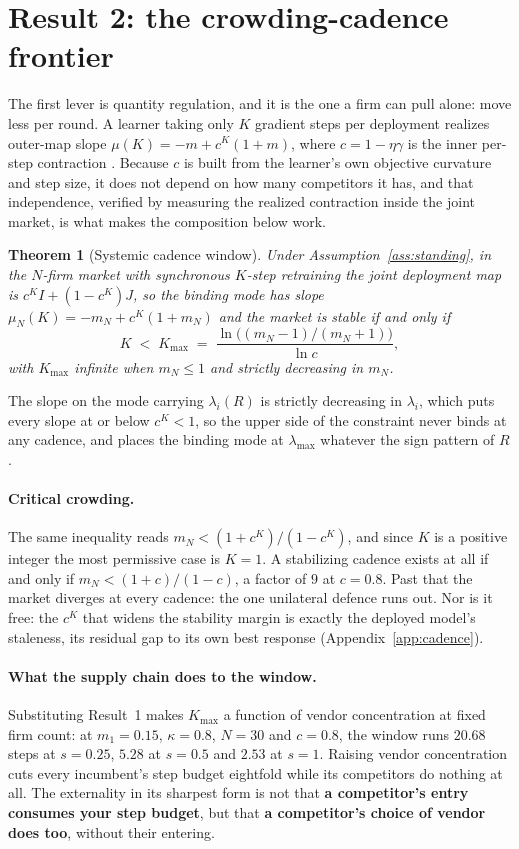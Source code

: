 \documentclass{article}
\theoremstyle{plain}
\newtheorem{theorem}{Theorem}
\theoremstyle{definition}
\newcommand{\mN}{m_N}
\newcommand{\lmax}{\lambda_{\max}}
\begin{document}
\section{Result 2: the crowding-cadence frontier}
\label{sec:cadence}

The first lever is quantity regulation, and it is the one a firm can pull alone: move less per round. A learner taking only $K$ gradient steps per deployment realizes outer-map slope $\mu(K) = -m + c^K(1+m)$, where $c = 1-\eta\gamma$ is the inner per-step contraction \citep{mendlerdunner2020}. Because $c$ is built from the learner's own objective curvature and step size, it does not depend on how many competitors it has, and that independence, verified by measuring the realized contraction inside the joint market, is what makes the composition below work.

\begin{theorem}[Systemic cadence window]
\label{thm:cadence}
Under Assumption~\ref{ass:standing}, in the $N$-firm market with synchronous $K$-step retraining the joint deployment map is $c^K I + (1-c^K)J$, so the binding mode has slope $\mu_N(K) = -\mN + c^K(1+\mN)$ and the market is stable if and only if
\begin{equation}
K \;<\; K_{\max} \;=\; \frac{\ln\bigl((\mN-1)/(\mN+1)\bigr)}{\ln c},
\end{equation}
with $K_{\max}$ infinite when $\mN \le 1$ and strictly decreasing in $\mN$.
\end{theorem}

The slope on the mode carrying $\lambda_i(R)$ is strictly decreasing in $\lambda_i$, which puts every slope at or below $c^K<1$, so the upper side of the constraint never binds at any cadence, and places the binding mode at $\lmax$ whatever the sign pattern of $R$.

\paragraph{Critical crowding.}
The same inequality reads $\mN < (1+c^K)/(1-c^K)$, and since $K$ is a positive integer the most permissive case is $K=1$. A stabilizing cadence exists at all if and only if $\mN < (1+c)/(1-c)$, a factor of $9$ at $c=0.8$. Past that the market diverges at every cadence: the one unilateral defence runs out. Nor is it free: the $c^K$ that widens the stability margin is exactly the deployed model's staleness, its residual gap to its own best response (Appendix~\ref{app:cadence}).

\paragraph{What the supply chain does to the window.}
Substituting Result~1 makes $K_{\max}$ a function of vendor concentration at fixed firm count: at $m_1 = 0.15$, $\kappa = 0.8$, $N=30$ and $c=0.8$, the window runs $20.68$ steps at $s = 0.25$, $5.28$ at $s = 0.5$ and $2.53$ at $s = 1$. Raising vendor concentration cuts every incumbent's step budget eightfold while its competitors do nothing at all. The externality in its sharpest form is not that \textbf{a competitor's entry consumes your step budget}, but that \textbf{a competitor's choice of vendor does too}, without their entering.
\end{document}
